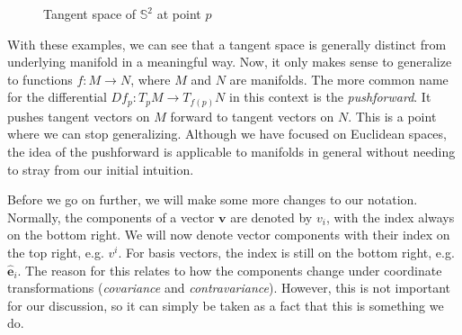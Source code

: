 \documentclass[a4paper,12pt]{article}
\begin{document}
\begin{figure}[!htbp]
\caption{Tangent space of $\mathbb{S}^2$ at point $p$}
\label{fig:sphere_tangent}
\end{figure}

With these examples, we can see that a tangent space is generally distinct from underlying manifold in a meaningful way.
Now, it only makes sense to generalize to functions $f \colon M \to N$, where $M$ and $N$ are manifolds.
The more common name for the differential $Df_p \colon T_p M \to T_{f(p)} N$ in this context is the \emph{pushforward}.
It pushes tangent vectors on $M$ forward to tangent vectors on $N$.
This is a point where we can stop generalizing.
Although we have focused on Euclidean spaces, the idea of the pushforward is applicable to manifolds in general without needing to stray from our initial intuition.

Before we go on further, we will make some more changes to our notation.
Normally, the components of a vector $\mathbf{v}$ are denoted by $v_i$, with the index always on the bottom right.
We will now denote vector components with their index on the top right, e.g. $v^i$.
For basis vectors, the index is still on the bottom right, e.g. $\mathbf{\hat{e}}_i$.
The reason for this relates to how the components change under coordinate transformations (\emph{covariance} and \emph{contravariance}).
However, this is not important for our discussion, so it can simply be taken as a fact that this is something we do.
\end{document}
